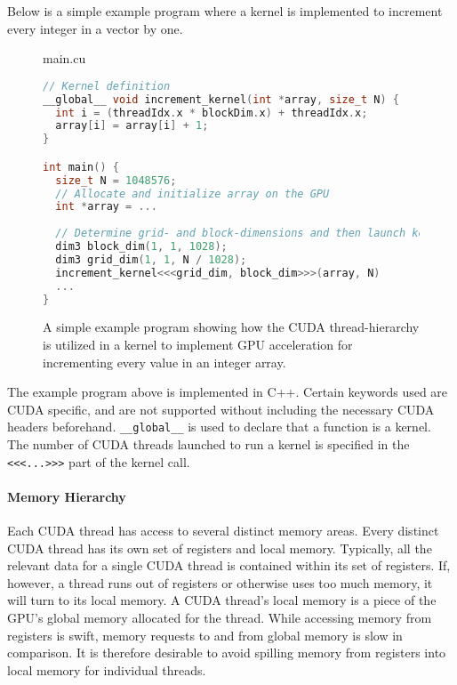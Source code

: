 Below is a simple example program where a kernel is implemented to increment every integer in a vector by one.
\begin{figure}[H]
\begin{center}
main.cu
\end{center}
\begin{lstlisting}[language=C++,style=cppcode]
// Kernel definition
__global__ void increment_kernel(int *array, size_t N) {
  int i = (threadIdx.x * blockDim.x) + threadIdx.x;
  array[i] = array[i] + 1;
}

int main() {
  size_t N = 1048576;
  // Allocate and initialize array on the GPU
  int *array = ...
  
  // Determine grid- and block-dimensions and then launch kernels
  dim3 block_dim(1, 1, 1028);
  dim3 grid_dim(1, 1, N / 1028);
  increment_kernel<<<grid_dim, block_dim>>>(array, N)
  ...
}
\end{lstlisting}
\caption{
  A simple example program showing how the CUDA thread-hierarchy is utilized in a kernel to implement GPU acceleration for incrementing every value in an integer array.
}
\label{background:graphical_processing_units:cuda:example_code}
\end{figure}

\lstset{language=C++,style=cppcode}

The example program above is implemented in C++.
Certain keywords used are CUDA specific, and are not supported without including the necessary CUDA headers beforehand.
\lstinline{__global__} is used to declare that a function is a kernel.
The number of CUDA threads launched to run a kernel is specified in the \lstinline{<<<...>>>} part of the kernel call.

\paragraph{Memory Hierarchy}
Each CUDA thread has access to several distinct memory areas.
Every distinct CUDA thread has its own set of registers and local memory.
Typically, all the relevant data for a single CUDA thread is contained within its set of registers.
If, however, a thread runs out of registers or otherwise uses too much memory, it will turn to its local memory.
A CUDA thread's local memory is a piece of the GPU's global memory allocated for the thread.
While accessing memory from registers is swift, memory requests to and from global memory is slow in comparison.
It is therefore desirable to avoid spilling memory from registers into local memory for individual threads.

